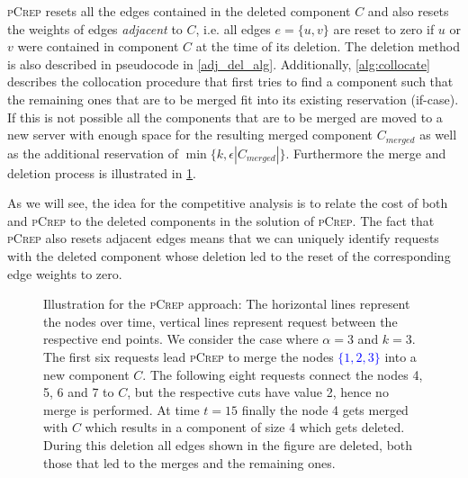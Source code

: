 \documentclass[a4paper,UKenglish,cleveref, autoref, thm-restate,authorcolumns]{../lipics/lipics-v2019}
\newcommand{\adjDel}{\textsc{pCrep}}
\newcommand{\opt}{\text{O{\scriptsize PT}}}
\newcommand{\new}[1]{{\textcolor{blue}{#1}}}
\newcommand{\old}[1]{{\text{\textcolor{red}{\sout{#1}}}}}
\newcommand{\request}[3]{\draw (axis cs:#3,#1) -- node[left]{} (axis cs:#3,#2);}
\begin{document}
\adjDel{} resets all the edges contained in the deleted component $C$ and also resets the 
weights of edges \textit{adjacent} to $C$, i.e. all edges $e=\{u,v\}$ are reset to zero 
if $u$ or $v$ were contained in component $C$ at the time of its deletion. The deletion
method is also described in pseudocode in \cref{adj_del_alg}.
Additionally, \cref{alg:collocate} describes the collocation procedure that first tries 
to find a component such that the remaining ones that are to be merged fit into its 
existing reservation (if-case). If this is not possible all the components that are to 
be merged are moved to a new server with enough space for the resulting merged component 
$C_{merged}$ as well as the additional reservation of $\min\{k, \epsilon|C_{merged}|\}$.
Furthermore the merge and deletion process is illustrated in \cref{exOldCrep}.

As we will see, the idea for the competitive analysis is to relate the cost of both \opt{} and \adjDel{} to the deleted components in the solution of \adjDel{}.
The fact that \adjDel{} also resets adjacent edges means that we can uniquely identify requests with the deleted component whose deletion led to the reset of the corresponding edge weights to zero. 

\begin{figure}
	\centering
	\caption{Illustration for the \adjDel{} approach: The horizontal lines represent the nodes over time, vertical lines represent request between the respective end points.  We consider the case where $\alpha=3$ and $k=3$.
	The first six requests lead \adjDel{} to merge the nodes \new{$\{1,2,3\}$}\old{$\{0,1,3\}$} into
	a new component $C$. The following eight requests connect the nodes 4, 5, 6 and 7 to $C$,
	but the respective cuts have value 2, hence no merge is performed. At time $t=15$ finally the node 4 gets merged with $C$ which results in a component of size 4 which gets deleted.
	During this deletion all edges shown in the figure are deleted, both those that led to the merges and the remaining ones.}\label{exOldCrep}
	
\end{figure}		
\end{document}
